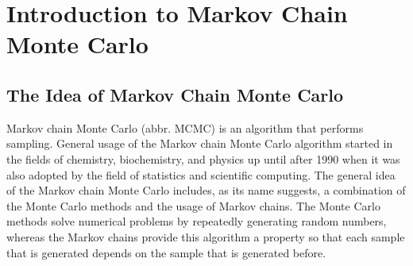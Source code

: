 \chapter{Introduction to Markov Chain Monte Carlo}

\section{The Idea of Markov Chain Monte Carlo}
Markov chain Monte Carlo (abbr. MCMC) is an algorithm that performs sampling. General usage of the Markov chain Monte Carlo algorithm started in the fields of chemistry, biochemistry, and physics up until after 1990 when it was also adopted by the field of statistics and scientific computing.\cite{mcmc_handbook} The general idea of the Markov chain Monte Carlo includes, as its name suggests, a combination of the Monte Carlo methods and the usage of Markov chains. The Monte Carlo methods solve numerical problems by repeatedly generating random numbers,\cite{monte_carlo_methods} whereas the Markov chains provide this algorithm a property so that each sample that is generated depends on the sample that is generated before.\cite{mcmc_wang}

